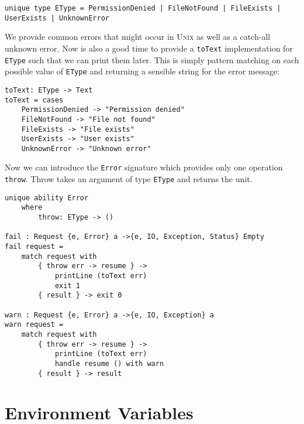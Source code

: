 \documentclass[logo,bsc,singlespacing,parskip]{infthesis}
\begin{document}
\begin{lstlisting}[language=unison]
unique type EType = PermissionDenied | FileNotFound | FileExists | UserExists | UnknownError
\end{lstlisting}

We provide common errors that might occur in \textsc{Unix} as well as a
catch-all unknown error. Now is also a good time to provide a \texttt{toText}
implementation for \texttt{EType} such that we can print them later. This is 
simply pattern matching on each possible value of \texttt{EType} and returning a sensible string for the error message:

\begin{lstlisting}[language=unison]
toText: EType -> Text
toText = cases  
    PermissionDenied -> "Permission denied"
    FileNotFound -> "File not found"
    FileExists -> "File exists"
    UserExists -> "User exists"
    UnknownError -> "Unknown error"
\end{lstlisting}

Now we can introduce the \texttt{Error} signature which provides only one
operation \texttt{throw}. Throw takes an argument of type \texttt{EType} and
returns the unit.

\begin{lstlisting}[language=unison]
unique ability Error
    where
        throw: EType -> ()

fail : Request {e, Error} a ->{e, IO, Exception, Status} Empty
fail request =
    match request with
        { throw err -> resume } -> 
            printLine (toText err)
            exit 1
        { result } -> exit 0

warn : Request {e, Error} a ->{e, IO, Exception} a
warn request =
    match request with
        { throw err -> resume } -> 
            printLine (toText err)
            handle resume () with warn
        { result } -> result
\end{lstlisting}

\section{Environment Variables}
\end{document}
